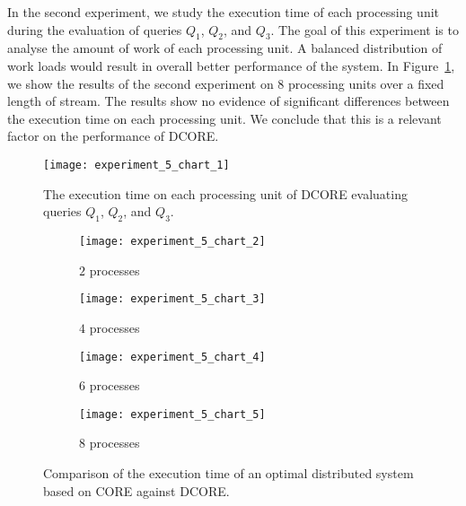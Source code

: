 In the second experiment, we study the execution time of each processing unit during the evaluation of queries $Q_{1}$, $Q_{2}$, and $Q_{3}$. The goal of this experiment is to analyse the amount of work of each processing unit. A balanced distribution of work loads would result in overall better performance of the system. In Figure~\ref{fig:experiment:5}, we show the results of the second experiment on $8$ processing units over a fixed length of stream. The results show no evidence of significant differences between the execution time on each processing unit. We conclude that this is a relevant factor on the performance of DCORE.

\begin{figure}[t]
  \centering
  \texttt{[image: experiment\_5\_chart\_1]}
  \caption{The execution time on each processing unit of DCORE evaluating queries $Q_{1}$, $Q_{2}$, and $Q_{3}$.}
  \label{fig:experiment:5}
\end{figure}

\begin{figure}[H]
     \begin{subfigure}[b]{0.49\textwidth}
         \centering
         \texttt{[image: experiment\_5\_chart\_2]}
         \caption{$2$ processes}
         \label{fig:experiment:6:subfigure:1}
     \end{subfigure}
     \begin{subfigure}[b]{0.49\textwidth}
         \centering
         \texttt{[image: experiment\_5\_chart\_3]}
         \caption{$4$ processes}
         \label{fig:experiment:6:subfigure:2}
     \end{subfigure}
     \begin{subfigure}[b]{0.49\textwidth}
         \centering
         \texttt{[image: experiment\_5\_chart\_4]}
         \caption{$6$ processes}
         \label{fig:experiment:6:subfigure:3}
     \end{subfigure}
     \begin{subfigure}[b]{0.49\textwidth}
         \centering
         \texttt{[image: experiment\_5\_chart\_5]}
         \caption{$8$ processes}
         \label{fig:experiment:6:subfigure:4}
     \end{subfigure}
     \caption{Comparison of the execution time of an optimal distributed system based on CORE against DCORE.}
     \label{fig:experiment:6}
\end{figure}

